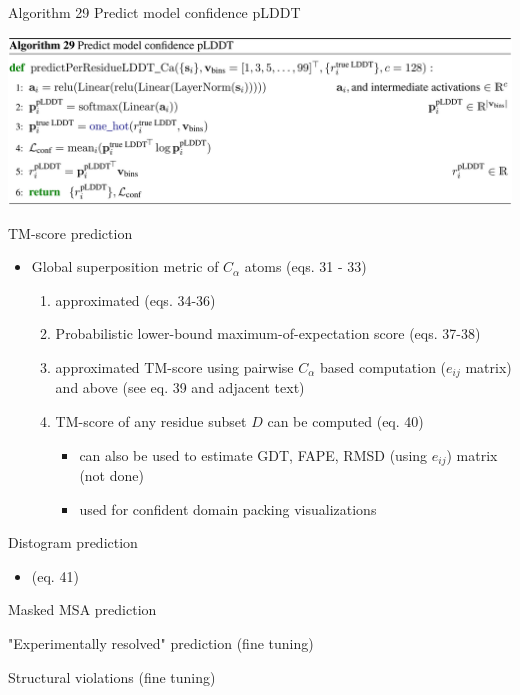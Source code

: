 \documentclass[presentation, smaller]{beamer}
\begin{document}
\begin{frame}[label={sec:orgb56e7cd}]{Algorithm 29 Predict model confidence pLDDT \cite{jumperHighlyAccurateProtein2021}}
\begin{center}
\includegraphics[width=.9\linewidth]{./imgs/algo29_confidence-pLDDT.png}
\end{center}
\end{frame}
\begin{frame}[label={sec:org68e22ae}]{TM-score prediction  \cite{jumperHighlyAccurateProtein2021}}
\begin{itemize}
\item Global superposition metric of \(C_\alpha\) atoms (eqs. 31 - 33)
\begin{enumerate}
\item approximated (eqs. 34-36)
\item Probabilistic lower-bound maximum-of-expectation score (eqs. 37-38)
\item approximated TM-score using pairwise \(C_\alpha\) based computation (\(e_{ij}\) matrix) and above (see eq. 39 and adjacent text)
\item TM-score of any residue subset \(D\) can be computed (eq. 40)
\begin{itemize}
\item can also be used to estimate GDT, FAPE, RMSD (using \(e_{ij}\)) matrix (not done)
\item used for confident domain packing visualizations
\end{itemize}
\end{enumerate}
\end{itemize}
\end{frame}

\begin{frame}[label={sec:org4923ac2}]{Distogram prediction  \cite{jumperHighlyAccurateProtein2021}}
\begin{itemize}
\item (eq. 41)
\end{itemize}
\end{frame}
\begin{frame}[label={sec:orgd4a4568}]{Masked MSA prediction  \cite{jumperHighlyAccurateProtein2021}}
\end{frame}
\begin{frame}[label={sec:org65442e9}]{"Experimentally resolved" prediction (fine tuning) \cite{jumperHighlyAccurateProtein2021}}
\end{frame}
\begin{frame}[label={sec:org1bacd5d}]{Structural violations (fine tuning)  \cite{jumperHighlyAccurateProtein2021}}
\end{frame}
\end{document}
